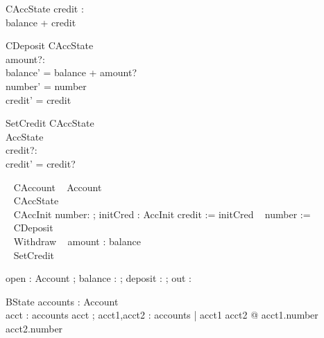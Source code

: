 \begin{schema}{CAccState}
\ohcircprotected credit : \nat \\
\where
balance + credit 
\end{schema}


 \begin{schema}{CDeposit}
 \Delta CAccState\\
 amount?:\nat\\
 \where
 balance' = balance + amount?\\
 number' = number\\
 credit' = credit 
 \end{schema}

 \begin{schema}{SetCredit}
 \Delta CAccState\\
 \Xi AccState\\
 credit?:\nat\\
 \where
 credit' = credit? 
 \end{schema}



\begin{circus}
  \ohcircclass ~ CAccount ~ \circdef \ohcircextends Account ~ \circbegin\\

  \ohcircstate ~ CAccState \\

  \ohcircinitial ~ CAccInit \circdef \circval number: \nat ; initCred : \nat \circspot AccInit \circseq credit := initCred ~ \circseq number := \ohcircnull\\

  \ohcircpublic ~ CDeposit\\
  
  \ohcircpublic ~ Withdraw ~ \circdef \circval amount : \nat \circspot  balance \prefixcolon [ amount \leq balance + credit , balance' = balance - amount ] \\

  
\ohcircpublic ~ SetCredit\\

\circend
\end{circus}



\begin{circus}
\circchannel open : Account ; 
             balance : \nat ;
             deposit : \nat \cross \nat ;
	     out : \nat
\end{circus}


\begin{schema}{BState}
 accounts : \power Account\\
\where
\forall acct : accounts \spot acct \neq \ohcircnull ;
\forall acct1,acct2 : accounts | acct1 \neq acct2 @ acct1.number \neq acct2.number
\end{schema}


